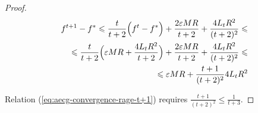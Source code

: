 \documentclass[runningheads, draft]{llncs}
\begin{document}
\begin{proof}
    \begin{equation}\label{eq:aecg-convergence-rage-t+1}
        \begin{split}
            f^{t+1} - f^* \leqslant \frac{t}{t + 2}\Bigl(f^t - f^*\Bigr)+
            \frac{2 \varepsilon M R}{t + 2} + \frac{4 L_t R^2}{(t + 2)^2}
            \leqslant \\
            \leqslant \frac{t}{t + 2}\Bigl(\varepsilon M R +
            \frac{4 L_t R^2}{t + 2}\Bigr) +
            \frac{2 \varepsilon M R}{t + 2} + \frac{4 L_t R^2}{(t + 2)^2}
            \leqslant \\
            \leqslant \varepsilon M R + \frac{t + 1}{(t + 2)^2} 4 L_t R^2
        \end{split}
    \end{equation}

    Relation (\ref{eq:aecg-convergence-rage-t+1}) requires
    $\frac{t + 1}{(t + 2)^2} \leqslant \frac{1}{t + 3}$.

\end{proof}
%
\end{document}

